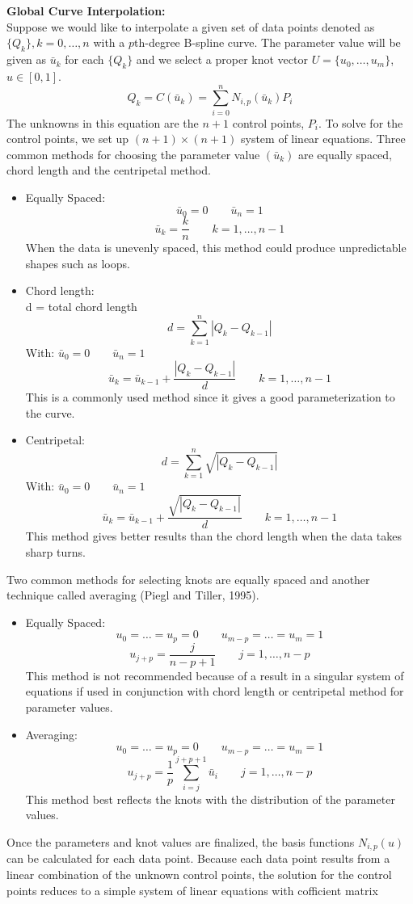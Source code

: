 \documentclass[11pt]{article}
\begin{document}
\\
\\
\textbf{Global Curve Interpolation:}
\\
Suppose we would like to interpolate a given set of data points denoted as $\{Q_k\}, k = 0,\ldots,n$ with a $p$th-degree B-spline curve. The parameter value will be given as $\bar{u}_k$ for each $\{Q_k\}$ and we select a proper knot vector $U = \{u_0,\ldots,u_m\}$, $u \in [0,1]$.
\\
$$Q_k = C(\bar{u}_k) = \sum^n_{i=0}N_{i,p}(\bar{u}_k)P_i$$
The unknowns in this equation are the $n+1$ control points, $P_i$. To solve for the control points,  we set up $(n+1) \times (n+1)$ system of linear equations. Three common methods for choosing the  parameter value $(\bar{u}_k)$ are equally spaced, chord length and the centripetal method.
\begin{itemize}
  \item Equally Spaced:
  \\
  $$ \bar{u}_0 = 0 \qquad \bar{u}_n = 1 $$
  $$ \bar{u}_k = \frac{k}{n} \qquad k = 1,\ldots,n-1$$
  When the data is unevenly spaced, this method could produce unpredictable shapes such as loops.
  \item Chord length:
  \\
  d = total chord length
  $$ d = \sum^n_{k=1} |Q_k-Q_{k-1}|$$
  With: \qquad $ \bar{u}_0 = 0 \qquad \bar{u}_n = 1 $
  $$ \bar{u}_k = \bar{u}_{k-1} + \frac{|Q_k-Q_{k-1}|}{d} \qquad k = 1,\ldots, n-1$$
  This is a commonly used method since it gives a good parameterization to the curve.
  \item Centripetal:
  \\
  $$ d = \sum^n_{k=1} \sqrt{|Q_k-Q_{k-1}|}$$
  With: \qquad $ \bar{u}_0 = 0 \qquad \bar{u}_n = 1 $
  $$ \bar{u}_k = \bar{u}_{k-1} + \frac{\sqrt{|Q_k-Q_{k-1}|}}{d} \qquad k = 1,\ldots, n-1$$
  This method gives better results than the chord length when the data takes sharp turns.
\end{itemize}
Two common methods for selecting knots are equally spaced and another technique called averaging (Piegl and Tiller, 1995).
\begin{itemize}
  \item Equally Spaced:
  \\
  $$ u_0 = \ldots = u_p = 0 \qquad u_{m-p} = \ldots = u_m = 1$$
  $$ u_{j+p} = \frac{j}{n-p+1} \qquad j = 1,\ldots, n-p$$
  This method is not recommended because of a result in a singular system of equations if used in conjunction with chord length or centripetal method for parameter values.
  \item Averaging:
  \\
  $$ u_0 = \ldots = u_p = 0 \qquad u_{m-p} = \ldots = u_m = 1$$
  $$ u_{j+p} = \frac{1}{p} \sum^{j+p+1}_{i=j} \bar{u}_i \qquad j = 1,\ldots,n-p$$
  This method best reflects the knots with the distribution of the parameter values.
\end{itemize}
Once the parameters and knot values are finalized, the basis functions $N_{i,p}(u)$ can be calculated for each data point. Because each data point results from a linear combination of the unknown control points, the solution for the control points reduces to a simple system of linear equations with cofficient matrix
\end{document}
